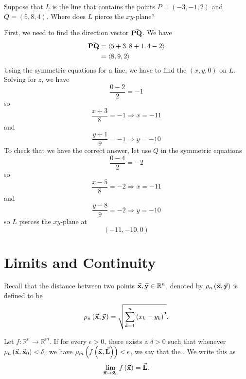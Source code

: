 \begin{exercise}
    Suppose that \( L \) is the line that contains the points \( P = (-3, -1, 2) \) and \( Q = (5,8,4) \). Where does \( L \) pierce the \( xy \)-plane?
\end{exercise}
\begin{solution}
    First, we need to find the direction vector \( \va{PQ} \). We have 
    \begin{align*}
        \va{PQ} &= \left< 5+3,8+1,4-2 \right> \\
        &= \left< 8,9,2 \right>
    \end{align*}
    Using the symmetric equations for a line, we have to find the \( (x,y,0) \) on \( L \). Solving for \( z \), we have 
    \[ \frac{0-2}{2}=-1 \]
    so 
    \[ \frac{x+3}{8} =-1 \Rightarrow x= -11 \]
    and 
    \[ \frac{y+1}{9}=-1 \Rightarrow y = -10 \]
    To check that we have the correct answer, let use \( Q \) in the symmetric equations 
    \[ \frac{0-4}{2} = -2 \]
    so 
    \[ \frac{x-5}{8} =-2 \Rightarrow x = -11 \]
    and 
    \[ \frac{y-8}{9}= -2 \Rightarrow y = -10 \]
    so \( L \) pierces the \( xy \)-plane at 
    \[ \boxed{\left( -11,-10, 0 \right)} \]
\end{solution}


\section{Limits and Continuity}

Recall that the distance between two points \( \va{x}, \va{y} \in \mathbb{R}^{n} \), denoted by \( \rho_{n} \left( \va{x}, \va{y} \right) \) is defined to be 
\[ \rho_{n} \left( \va{x}, \va{y} \right) = \sqrt{\sum_{k=1}^{n} \left( x_{k} -y_{k} \right)^{2}}  .\]

\begin{dfn}
    Let \( f: \mathbb{R}^{n} \to \mathbb{R}^{m} \). If for every \( \epsilon > 0 \), there exists a \( \delta > 0 \) such that whenever \( \rho_{n} \left( \va{x}, \va{x}_{0} \right) < \delta \), we have \( \rho_{m} \left( f \left( \va{x}, \va{L} \right) \right) < \epsilon\), we say that the . We write this as 
    \[ \lim_{\va{x} \to \va{x}_{0}} f \left( \va{x} \right) = \va{L}.\]
\end{dfn}